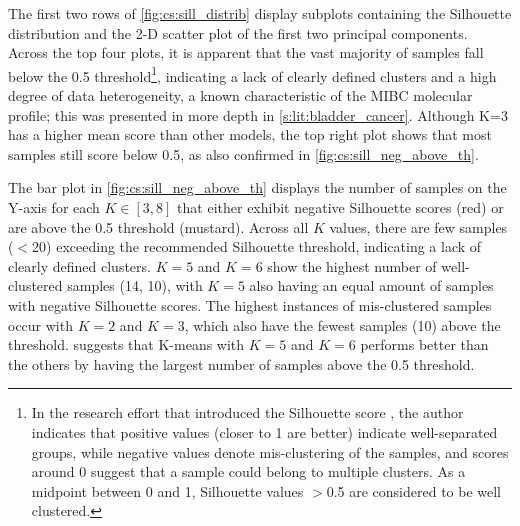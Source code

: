 The first two rows of \cref{fig:cs:sill_distrib} display subplots containing the Silhouette distribution and the 2-D scatter plot of the first two principal components. Across the top four plots, it is apparent that the vast majority of samples fall below the 0.5 threshold\footnote{In the research effort that introduced the Silhouette score \citep{Rousseeuw1987-wy}, the author indicates that positive values (closer to 1 are better) indicate well-separated groups, while negative values denote mis-clustering of the samples, and scores around 0 suggest that a sample could belong to multiple clusters. As a midpoint between 0 and 1, Silhouette values $>$0.5 are considered to be well clustered.}, indicating a lack of clearly defined clusters and a high degree of data heterogeneity, a known characteristic of the MIBC molecular profile; this was presented in more depth in \cref{s:lit:bladder_cancer}. Although K=3 has a higher mean score than other models, the top right plot shows that most samples still score below 0.5, as also confirmed in \cref{fig:cs:sill_neg_above_th}.


The bar plot in \cref{fig:cs:sill_neg_above_th} displays the number of samples on the Y-axis for each $K \in [3, 8]$ that either exhibit negative Silhouette scores (red) or are above the 0.5 threshold (mustard). Across all $K$ values, there are few samples ($<$20) exceeding the recommended Silhouette threshold, indicating a lack of clearly defined clusters. $K=5$ and $K=6$ show the highest number of well-clustered samples (14, 10), with $K=5$ also having an equal amount of samples with negative Silhouette scores. The highest instances of mis-clustered samples occur with $K=2$ and $K=3$, which also have the fewest samples (10) above the threshold.  suggests that K-means with $K=5$ and $K=6$ performs better than the others by having the largest number of samples above the 0.5 threshold.


